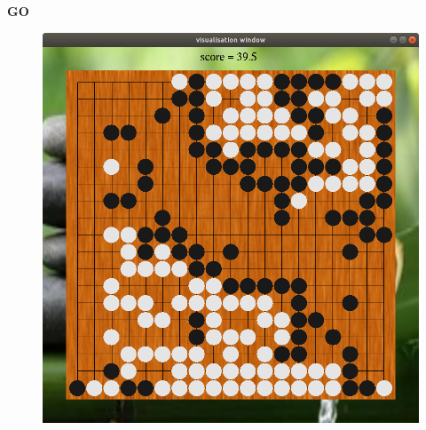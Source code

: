 \documentclass[xcolor=dvipsnames]{beamer}
\begin{document}
\begin{frame}{\bf GO}

\begin{figure}[!htb]
  \centering
  \includegraphics[scale=0.2]{../../pictures/go_board.png}
\end{figure}

\end{frame}
\end{document}
